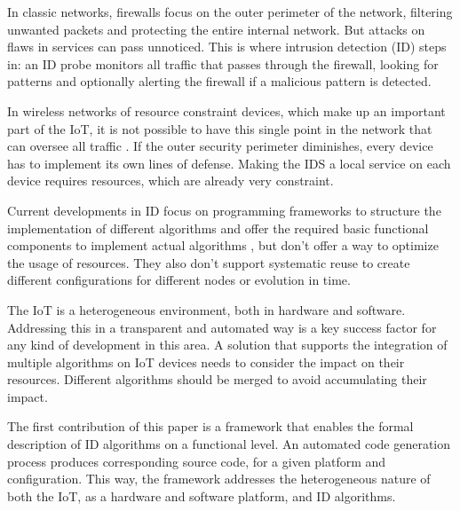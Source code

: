 \documentclass[conference]{IEEEtran}
\begin{document}

In classic networks, firewalls focus on the outer perimeter of the network,
filtering unwanted packets and protecting the entire internal network. But
attacks on flaws in services can pass unnoticed. This is where intrusion
detection (ID) steps in: an ID probe monitors all traffic that passes through
the firewall, looking for patterns and optionally alerting the firewall if a
malicious pattern is detected\cite{denning1987intrusion}.


In wireless networks of resource constraint devices, which make up an important
part of the IoT, it is not possible to have this single point in the network
that can oversee all traffic \cite{zhang2000intrusion, mishra2004intrusion}. If
the outer security perimeter diminishes, every device has to implement its own
lines of defense. Making the IDS a local service on each device requires
resources, which are already very constraint.


Current developments in ID focus on programming frameworks to structure the
implementation of different algorithms \cite{valero2012di} and offer the
required basic functional components to implement actual algorithms
\cite{krontiris2008lidea}, but don't offer a way to optimize the usage of
resources. They also don't support systematic reuse to create different
configurations for different nodes or evolution in time.


The IoT is a heterogeneous environment, both in hardware and software.
Addressing this in a transparent and automated way is a key success factor for
any kind of development in this area. A solution that supports the integration
of multiple algorithms on IoT devices needs to consider the impact on their
resources. Different algorithms should be merged to avoid accumulating their
impact.



The first contribution of this paper is a framework that enables the formal
description of ID algorithms on a functional level. An automated code
generation process produces corresponding source code, for a given platform and
configuration. This way, the framework addresses the heterogeneous nature of
both the IoT, as a hardware and software platform, and ID algorithms.
\end{document}
